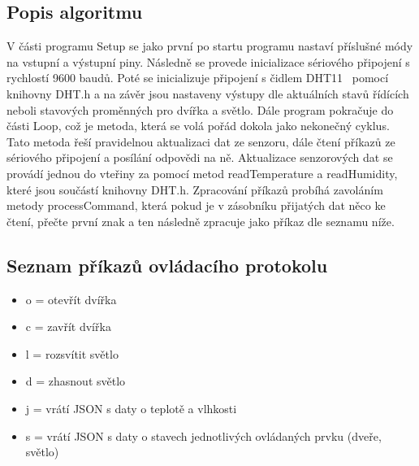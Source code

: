 \subsection*{Popis algoritmu}
V části programu Setup se jako první po startu programu nastaví příslušné módy na vstupní a výstupní piny.
Následně se provede inicializace sériového připojení s rychlostí 9600 baudů.
Poté se inicializuje připojení s čidlem DHT11~\cite{DHT11Datasheet} pomocí knihovny DHT.h a na závěr jsou nastaveny výstupy dle aktuálních stavů řídících neboli stavových proměnných pro dvířka a světlo.
Dále program pokračuje do části Loop, což je metoda, která se volá pořád dokola jako nekonečný cyklus.
Tato metoda řeší pravidelnou aktualizaci dat ze senzoru, dále čtení příkazů ze sériového připojení a posílání odpovědi na ně.
Aktualizace senzorových dat se provádí jednou do vteřiny za pomocí metod readTemperature a readHumidity, které jsou součástí knihovny DHT.h.
Zpracování příkazů probíhá zavoláním metody processCommand, která pokud je v zásobníku přijatých dat něco ke čtení, přečte první znak a ten následně zpracuje jako příkaz dle seznamu níže.

\subsection*{Seznam příkazů ovládacího protokolu}
\begin{itemize}
    \item o = otevřít dvířka
    \item c = zavřít dvířka
    \item l = rozsvítit světlo
    \item d = zhasnout světlo
    \item j = vrátí JSON s daty o teplotě a vlhkosti
    \item s = vrátí JSON s daty o stavech jednotlivých ovládaných prvku (dveře, světlo)
\end{itemize}




%
%
%
%